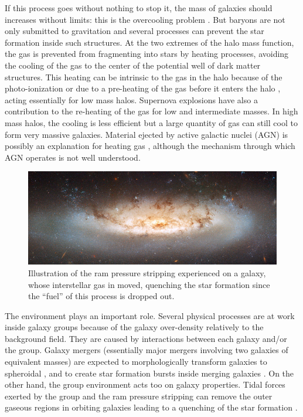 If this process goes without nothing to stop it, the mass of galaxies should
increases without limits: this is the overcooling problem \citep{White+78,
Blanchard+92}. But baryons are not only submitted to gravitation and several
processes can prevent the star formation inside such structures. At the two
extremes of the halo mass function, the gas is prevented from fragmenting into
stars by heating processes, avoiding the cooling of the gas to the center of
the potential well of dark matter structures. This heating can be intrinsic to
the gas in the halo because of the photo-ionization \citep{Rees+86} or due to a
pre-heating of the gas before it enters the halo \citep{Borgani+01}, acting
essentially for low mass halos. Supernova explosions have also a contribution
to the re-heating of the gas \citep{Dekel+86, Efstathiou+00} for low and
intermediate masses. In high mass halos, the cooling is less efficient but a
large quantity of gas can still cool to form very massive galaxies. Material
ejected by active galactic nuclei (AGN) is possibly an explanation for heating
gas \citep{Silk+98}, although the mechanism through which AGN operates is not
well understood.
%
\begin{figure}[htb]
    \centering
    \includegraphics[width=\linewidth]{figures/introduction/rampressure.jpg}
    \caption{Illustration of the ram pressure stripping experienced on a
    galaxy, whose interstellar gas in moved, quenching the star formation since
the ``fuel'' of this process is dropped out.\label{fig:rampressure}}
\end{figure}

The environment plays an important role. Several physical processes are at work
inside galaxy groups because of the galaxy over-density relatively to the
background field. They are caused by interactions between each galaxy and/or
the group. Galaxy mergers (essentially major mergers involving two galaxies of
equivalent masses) are expected to morphologically transform galaxies to
spheroidal \citep{Naab+99,Bournaud+05, Mamon+92}, and to create star formation
bursts inside merging galaxies \citep{Cox+08,Teyssier+10}. On the other hand,
the group environment acts too on galaxy properties. Tidal forces exerted by
the group and the ram pressure stripping can remove the outer gaseous regions
in orbiting galaxies leading to a quenching of the star formation
\citep{Larson+80,Bekki+13}.

